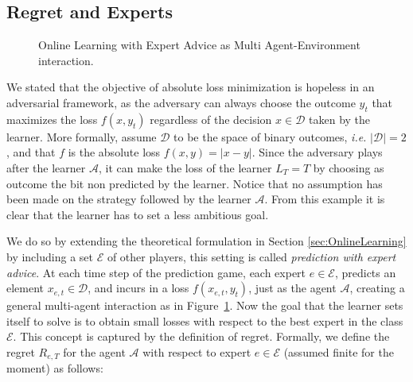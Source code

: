


\subsection{Regret and Experts}
\begin{figure}[t!]
\centering

\caption{Online Learning with Expert Advice as Multi Agent-Environment interaction.}
\label{fig:OL}
\end{figure}
We stated that the objective of absolute loss minimization is hopeless in an adversarial framework, as the adversary can always choose the outcome $y_t$ that maximizes the loss $f(x,y_t)$ regardless of the decision $x\in\mathcal D$ taken by the learner. More formally, assume $\mathcal D$ to be the space of binary outcomes, \emph{i.e.} $|\mathcal D|=2$, and that $f$ is the absolute loss $f(x,y)=|x - y|$. Since the adversary plays after the learner $\mathcal A$, it can  make the loss of the learner $L_T=T$ by choosing as outcome the bit non predicted by the learner. Notice that no assumption has been made on the strategy followed by the learner $\mathcal A$.
From this example it is clear that the learner has to set a less ambitious goal.

We do so by extending the theoretical formulation in Section \ref{sec:OnlineLearning} by including a set $\mathcal E$ of other players, this setting is called \emph{prediction with expert advice}. At each time step of the prediction game, each expert $e\in\mathcal E$, predicts an element $x_{e,t}\in\mathcal D$, and incurs in a loss $f(x_{e,t},y_t)$, just as the agent $\mathcal A$, creating a general multi-agent interaction as in Figure~\ref{fig:OL}. 
Now the goal that the learner sets itself to solve is to obtain small losses with respect to the best expert in the class $\mathcal E$. This concept is captured by the definition of regret.
Formally, we define the regret $R_{e,T}$ for the agent $\mathcal A$ with respect to expert $e\in\mathcal E$ (assumed finite for the moment) as follows:


